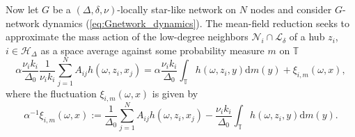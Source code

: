 \documentclass[a4paper]{article}
\theoremstyle{plain}
\theoremstyle{definition}
\newtheorem{defn}[theorem]{Definition}%
\newcommand{\PP}{\mathbb{P}}
\newcommand{\R}{\mathbb{R}}
\newcommand{\T}{\mathbb{T}}
\newcommand{\N}{\mathbb{N}}
\newcommand{\Fil}{\mathcal{F}}
\newcommand{\Hil}{\mathcal{H}}
\newcommand{\Lil}{\mathcal{L}}
\newcommand{\Nil}{\mathcal{N}}
\begin{document}
Now let $G$ be a $(\Delta,\delta,\nu)$-locally star-like network on $N$ nodes and consider $G$-network dynamics (\ref{eq:Gnetwork_dynamics}).
The mean-field reduction seeks to approximate the mass action of the low-degree neighbors $\Nil_i\cap\Lil_{\delta}$ of a hub $z_i$, $i\in \Hil_{\Delta}$ as a space average against some probability measure $m$ on $\T$
$$\alpha \frac{\nu_ik_i}{\Delta_0} \frac{1}{\nu_ik_i}\sum_{j=1}^N A_{ij}h(\omega,z_i,x_j) = \alpha\frac{\nu_i k_i}{\Delta_0} \int_{\T} h(\omega,z_i,y)\mathrm{d}m(y)+\xi_{i,m}(\omega,x),$$
where the fluctuation $\xi_{i,m}(\omega,x)$ is given by
$$\alpha^{-1}\xi_{i,m}(\omega,x):= \frac{1}{\Delta_0} \sum_{j=1}^N A_{ij}h(\omega,z_i,x_j) -  \frac{\nu_i k_i}{\Delta_0} \int_{\T} h(\omega,z_i,y)\mathrm{d}m(y).$$



\end{document}
